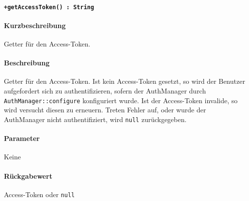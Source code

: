 \paragraph{\texttt{+getAccessToken() : String}}%
\paragraph*{Kurzbeschreibung}
Getter für den Access-Token.
\paragraph*{Beschreibung}
Getter für den Access-Token.
Ist kein Access-Token gesetzt, so wird der Benutzer aufgefordert sich zu authentifizieren, sofern der AuthManager durch \verb#AuthManager::configure# konfiguriert wurde.
Ist der Access-Token invalide, so wird versucht diesen zu erneuern.
Treten Fehler auf, oder wurde der AuthManager nicht authentifiziert, wird \verb#null# zurückgegeben.
\paragraph*{Parameter}
Keine
\paragraph*{Rückgabewert}
Access-Token oder \verb#null#